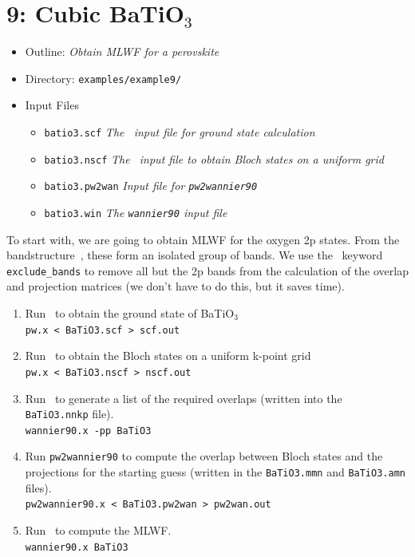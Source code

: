 \documentclass[a4paper,11pt,twoside]{article}
\begin{document}
\cleardoublepage


\section*{9: Cubic BaTiO$_3$}
\begin{itemize}
\item{Outline: \it{Obtain MLWF for a perovskite}}
\item{Directory: {\tt examples/example9/}}
\item{Input Files}
\begin{itemize}
\item{ {\tt batio3.scf}  {\it The \pwscf\ input file for ground state
    calculation}} 
\item{ {\tt batio3.nscf}  {\it The \pwscf\ input file to obtain Bloch states
    on a uniform grid}} 
\item{ {\tt batio3.pw2wan}  {\it Input file for {\tt pw2wannier90}}}
\item{ {\tt  batio3.win}  {\it The {\tt wannier90} input file}}
\end{itemize}
\end{itemize}

 To start with, we are going to obtain MLWF for the oxygen 2p
  states. From the bandstructure~\cite{BaTiO3}, these form an isolated
  group of bands. We use the \wannier\ keyword {\tt exclude\_bands} to
  remove all but the 2p bands from the calculation of the overlap
  and projection matrices (we don't have to do this, but it saves time).

\begin{enumerate}
\item Run \pwscf\ to obtain the ground state of BaTiO$_3$\\
{\tt pw.x < BaTiO3.scf > scf.out}

\item Run \pwscf\ to obtain the Bloch states on a uniform k-point grid\\
{\tt pw.x < BaTiO3.nscf > nscf.out}

\item Run \wannier\ to generate a list of the required overlaps (written
  into the {\tt BaTiO3.nnkp} file).\\ 
{\tt wannier90.x -pp BaTiO3}

\item Run {\tt pw2wannier90} to compute the overlap between Bloch
  states and the projections for the starting guess (written in the
  {\tt BaTiO3.mmn} and {\tt BaTiO3.amn} files).\\  
{\tt pw2wannier90.x < BaTiO3.pw2wan > pw2wan.out}

\item Run \wannier\ to compute the MLWF.\\
{\tt wannier90.x BaTiO3}
\end{enumerate}
\end{document}
